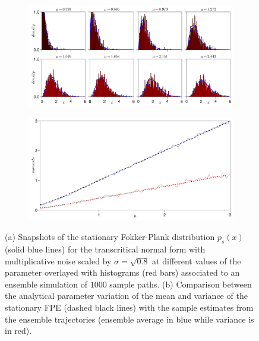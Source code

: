 \documentclass[../main.tex]{subfiles}
\begin{document}
\begin{example_continued}
\begin{figure}[H]
        \begin{subfigure}[b]{0.95\textwidth}
                \centering 
                \includegraphics[keepaspectratio, width = \linewidth]{../figures/fig3.7.1.png}
                \label{fig3.7.1}
                \caption{}
        \end{subfigure}
        \newpage
        \begin{subfigure}[b]{0.95\textwidth}
                \centering 
                \includegraphics[keepaspectratio, width = \linewidth]{../figures/fig3.7.2.png}
                \label{fig3.7.2}
                \caption{}
        \end{subfigure}
         \caption{(a) Snapshots of the stationary Fokker-Plank distribution $p_{s}(x)$ (solid blue lines) for the transcritical normal form with multiplicative noise scaled by $\sigma = \sqrt{0.8}$ at different values of the parameter overlayed with histograms (red bars) associated to an ensemble simulation of $1000$ sample paths. (b) Comparison between the analytical parameter variation of the mean and variance of the stationary FPE (dashed black lines) with the sample estimates from the ensemble trajectories (ensemble average in blue while variance is in red).}
         \label{fig3.7}
\end{figure}
\end{example_continued}
\end{document}
